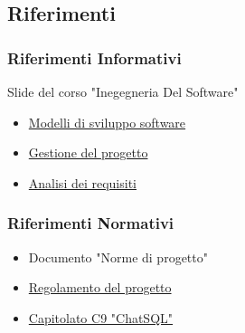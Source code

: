 \documentclass[5pt]{article}
\begin{document}
  \subsection{Riferimenti}
    \subsubsection{Riferimenti Informativi}
      Slide del corso "Inegegneria Del Software"
      \begin{itemize}
            \item \href{https://www.math.unipd.it/~tullio/IS-1/2023/Dispense/T3.pdf}{Modelli di sviluppo software}
            \item \href{https://www.math.unipd.it/~tullio/IS-1/2023/Dispense/T4.pdf}{Gestione del progetto}
            \item \href{https://www.math.unipd.it/~tullio/IS-1/2023/Dispense/T5.pdf}{Analisi dei requisiti} 
      \end{itemize}
    \subsubsection{Riferimenti Normativi}
      \begin{itemize}
            \item Documento "Norme di progetto"
            \item \href{https://www.math.unipd.it/~tullio/IS-1/2023/Dispense/PD2.pdf}{Regolamento del progetto}
            \item \href{https://www.math.unipd.it/~tullio/IS-1/2023/Progetto/C9.pdf}{Capitolato C9 "ChatSQL"} 
      \end{itemize}
\end{document}
